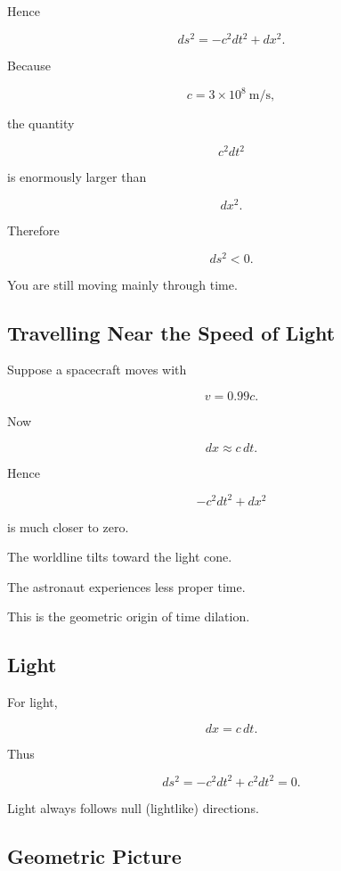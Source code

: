 \documentclass[12pt,a4paper]{article}
\theoremstyle{notespace}
\begin{document}
Hence

\[
ds^2
=
-c^2dt^2
+
dx^2.
\]

Because

\[
c
=
3\times10^8
\ \mathrm{m/s},
\]

the quantity

\[
c^2dt^2
\]

is enormously larger than

\[
dx^2.
\]

Therefore

\[
ds^2<0.
\]

You are still moving mainly through time.


\subsection{Travelling Near the Speed of Light}

Suppose a spacecraft moves with

\[
v=0.99c.
\]

Now

\[
dx
\approx
c\,dt.
\]

Hence

\[
-c^2dt^2
+
dx^2
\]

is much closer to zero.

The worldline tilts toward the light cone.

The astronaut experiences less proper time.

This is the geometric origin of time dilation.


\subsection{Light}

For light,

\[
dx
=
c\,dt.
\]

Thus

\[
ds^2
=
-c^2dt^2
+
c^2dt^2
=
0.
\]

Light always follows null (lightlike) directions.


\subsection{Geometric Picture}
\end{document}
